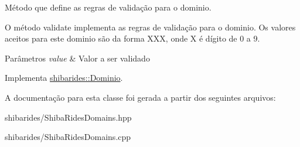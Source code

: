 Método que define as regras de validação para o dominio. 

O método validate implementa as regras de validação para o dominio. Os valores aceitos para este dominio são da forma X\+XX, onde X é dígito de 0 a 9.


\begin{DoxyParams}{Parâmetros}
{\em value} & Valor a ser validado \\
\hline
\end{DoxyParams}


Implementa \hyperlink{classshibarides_1_1Dominio_acc9445531455c072bbf708709aebbe55}{shibarides\+::\+Dominio}.



A documentação para esta classe foi gerada a partir dos seguintes arquivos\+:\begin{DoxyCompactItemize}
\item 
shibarides/Shiba\+Rides\+Domains.\+hpp\item 
shibarides/Shiba\+Rides\+Domains.\+cpp\end{DoxyCompactItemize}
